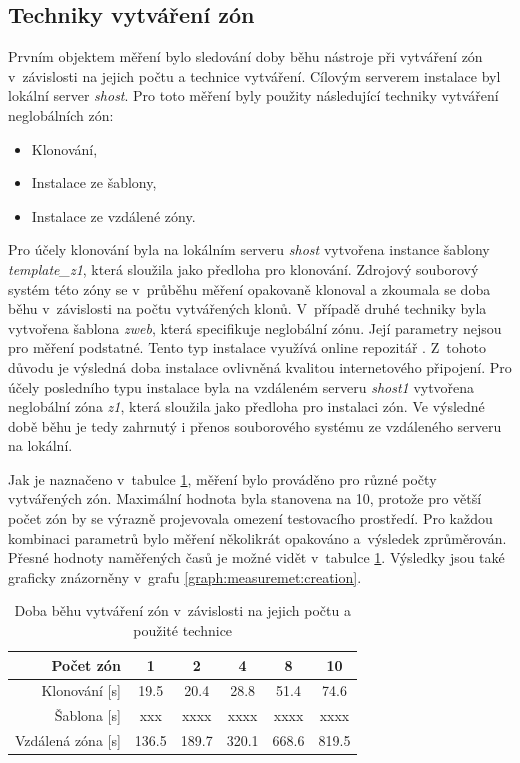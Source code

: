 \subsection{Techniky vytváření zón}
\label{chapter:measurement:creation}
Prvním objektem měření bylo sledování doby běhu nástroje při vytváření zón v~závislosti na jejich počtu a technice vytváření. Cílovým
serverem instalace byl lokální server \textit{shost}. Pro toto měření byly použity následující techniky vytváření neglobálních zón:
\begin{itemize}
 \item Klonování,
 \item Instalace ze šablony,
 \item Instalace ze vzdálené zóny.
\end{itemize}
Pro účely klonování byla na lokálním serveru \textit{shost} vytvořena instance šablony \textit{template\_z1}, která sloužila jako 
předloha pro klonování. Zdrojový souborový systém této zóny se v~průběhu měření opakovaně klonoval a zkoumala se doba běhu
v~závislosti na počtu vytvářených klonů. V~případě druhé techniky byla vytvořena šablona \textit{zweb}, která specifikuje neglobální
zónu. Její parametry nejsou pro měření podstatné. Tento typ instalace využívá online repozitář \cite{oracle:solaris:desing:pkg_repository}.
Z~tohoto důvodu je výsledná doba instalace ovlivněná kvalitou internetového připojení. Pro účely posledního typu instalace byla
na vzdáleném serveru \textit{shost1} vytvořena neglobální zóna \textit{z1}, která sloužila jako předloha pro instalaci zón. Ve
výsledné době běhu je tedy zahrnutý i přenos souborového systému ze vzdáleného serveru na lokální.

Jak je naznačeno v~tabulce \ref{table:measuremet:creation}, měření bylo prováděno pro různé počty vytvářených zón. Maximální
hodnota byla stanovena na 10, protože pro větší počet zón by se výrazně projevovala omezení testovacího prostředí. Pro každou
kombinaci parametrů bylo měření několikrát opakováno a~výsledek zprůměrován. Přesné hodnoty naměřených časů je možné vidět v~tabulce
\ref{table:measuremet:creation}. Výsledky jsou také graficky znázorněny v~grafu \ref{graph:measuremet:creation}.
\begin{table}
  \centering
  \label{table:measuremet:creation}
  \caption{Doba běhu vytváření zón v~závislosti na jejich počtu a použité technice}
  \begin{tabular}{ r | c c c c c}
   Počet zón & 1 & 2 & 4 & 8 & 10 \\ \hline
   Klonování [s] & 19.5 & 20.4 & 28.8 & 51.4 & 74.6 \\
   Šablona [s] & xxx & xxxx & xxxx & xxxx & xxxx \\
   Vzdálená zóna [s] & 136.5 & 189.7 & 320.1 & 668.6 & 819.5 \\
  \end{tabular}
\end{table}

